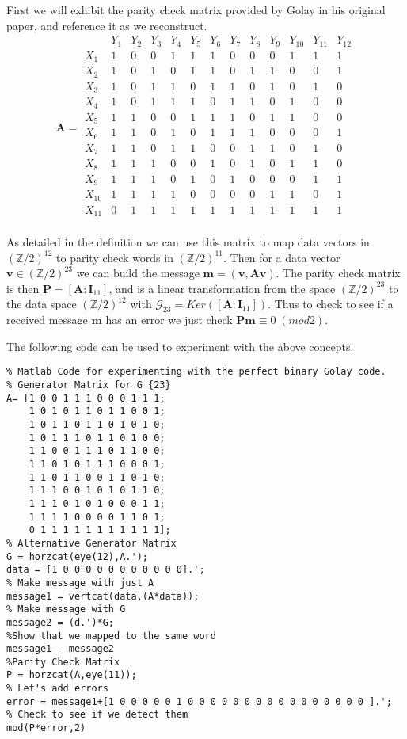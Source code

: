 \documentclass[paper=a4, fontsize=11pt]{scrartcl} %
\numberwithin{equation}{section} %
\numberwithin{figure}{section} %
\numberwithin{table}{section} %
\theoremstyle{break}
\begin{document}
First we will exhibit the parity check matrix provided by Golay in his original paper, and reference it as we reconstruct.
$$\textbf{A} = \begin{array}{ccccccccccccc}
& Y_1 & Y_2 & Y_3 & Y_4 & Y_5 & Y_6 & Y_7 & Y_8 & Y_9 & Y_{10} & Y_{11} & Y_{12} \\
   X_1 & 1 & 0 & 0 & 1 & 1 & 1 & 0 & 0 & 0 & 1 & 1 & 1\\
   X_2 & 1 & 0 & 1 & 0 & 1 & 1 & 0 & 1 & 1 & 0 & 0 & 1\\
   X_3 & 1 & 0 & 1 & 1 & 0 & 1 & 1 & 0 & 1 & 0 & 1 & 0\\
   X_4 & 1 & 0 & 1 & 1 & 1 & 0 & 1 & 1 & 0 & 1 & 0 & 0\\
   X_5 & 1 & 1 & 0 & 0 & 1 & 1 & 1 & 0 & 1 & 1 & 0 & 0\\
   X_6 & 1 & 1 & 0 & 1 & 0 & 1 & 1 & 1 & 0 & 0 & 0 & 1\\
   X_7 & 1 & 1 & 0 & 1 & 1 & 0 & 0 & 1 & 1 & 0 & 1 & 0\\
   X_8 & 1 & 1 & 1 & 0 & 0 & 1 & 0 & 1 & 0 & 1 & 1 & 0\\
   X_9 & 1 & 1 & 1 & 0 & 1 & 0 & 1 & 0 & 0 & 0 & 1 & 1\\
X_{10} & 1 & 1 & 1 & 1 & 0 & 0 & 0 & 0 & 1 & 1 & 0 & 1\\
X_{11} & 0 & 1 & 1 & 1 & 1 & 1 & 1 & 1 & 1 & 1 & 1 & 1\\
\end{array}$$

As detailed in the definition we can use this matrix to map data vectors in $(\mathbb{Z}/2)^{12}$ to parity check words in $(\mathbb{Z}/2)^{11}$. Then for a data vector $\mathbf{v} \in (\mathbb{Z}/2)^{23}$ we can build the message $\mathbf{m} = (\mathbf{v},\mathbf{A}\mathbf{v})$. The parity check matrix is then $\textbf{P} = [\mathbf{A}:\mathbf{I}_{11}]$, and is a linear transformation from the space $(\mathbb{Z}/2)^{23}$ to the data space $(\mathbb{Z}/2)^{12}$ with  $\mathcal{G}_{23}=Ker([\mathbf{A}:\mathbf{I}_{11}])$. Thus to check to see if a received message $\mathbf{m}$ has an error we just check $\mathbf{Pm} \equiv 0 \; (mod 2)$.

The following code can be used to experiment with the above concepts.
\begin{lstlisting}
% Matlab Code for experimenting with the perfect binary Golay code.
% Generator Matrix for G_{23}
A= [1 0 0 1 1 1 0 0 0 1 1 1;
    1 0 1 0 1 1 0 1 1 0 0 1;
    1 0 1 1 0 1 1 0 1 0 1 0;
    1 0 1 1 1 0 1 1 0 1 0 0;
    1 1 0 0 1 1 1 0 1 1 0 0;
    1 1 0 1 0 1 1 1 0 0 0 1;
    1 1 0 1 1 0 0 1 1 0 1 0;
    1 1 1 0 0 1 0 1 0 1 1 0;
    1 1 1 0 1 0 1 0 0 0 1 1;
    1 1 1 1 0 0 0 0 1 1 0 1;
    0 1 1 1 1 1 1 1 1 1 1 1];
% Alternative Generator Matrix
G = horzcat(eye(12),A.');
data = [1 0 0 0 0 0 0 0 0 0 0 0].';
% Make message with just A
message1 = vertcat(data,(A*data));
% Make message with G
message2 = (d.')*G;
%Show that we mapped to the same word
message1 - message2
%Parity Check Matrix
P = horzcat(A,eye(11));
% Let's add errors
error = message1+[1 0 0 0 0 0 1 0 0 0 0 0 0 0 0 0 0 0 0 0 0 0 0 ].';
% Check to see if we detect them
mod(P*error,2)
\end{lstlisting}
\end{document}
